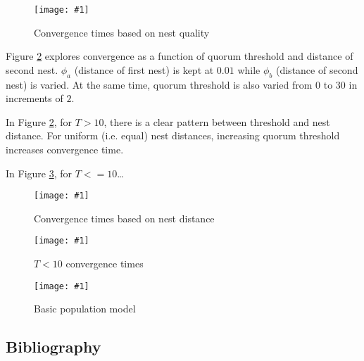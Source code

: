 \documentclass{article}
\newcommand{\plot}[3]{
    \begin{figure}[h]
        \texttt{[image: \#1]}
        \caption{#2}
        \label{fig:#1}
    \end{figure}
}
\begin{document}
\plot{convergence_times}{Convergence times based on nest quality}{0.6}

Figure \ref{fig:distance_convergence_times} explores convergence as a function of quorum threshold and distance of second nest. 
$\phi_a$ (distance of first nest) is kept at $0.01$ while $\phi_b$ (distance of second nest) is varied.
At the same time, quorum threshold is also varied from $0$ to $30$ in increments of $2$.

In Figure \ref{fig:distance_convergence_times}, for $T > 10$, there is a clear pattern between threshold and nest distance. 
For uniform (i.e. equal) nest distances, increasing quorum threshold increases convergence time.

In Figure \ref{fig:distance_convergence_times_low_T}, for $T <= 10$\dots

\plot{distance_convergence_times}{Convergence times based on nest distance}{0.6}

\plot{distance_convergence_times_low_T}{$T < 10$ convergence times}{0.6}

\plot{agent_based_population_model}{Basic population model}{0.6}



\subsection{Bibliography}
  

\footnotesize


\end{document}
